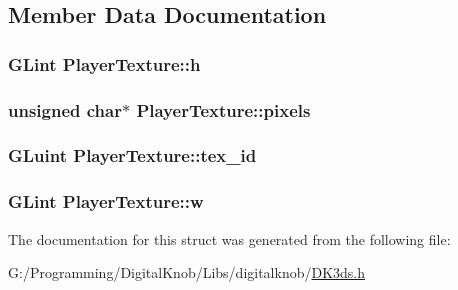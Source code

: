 \subsection{Member Data Documentation}
\hypertarget{struct_player_texture_a2b5358c10f1b91f060de579182ec6cd7}{
\subsubsection[{h}]{\setlength{\rightskip}{0pt plus 5cm}G\-Lint Player\-Texture\-::h}}\label{struct_player_texture_a2b5358c10f1b91f060de579182ec6cd7}
\hypertarget{struct_player_texture_ad61cf88f950df3a4307de8faaef27ef1}{
\subsubsection[{pixels}]{\setlength{\rightskip}{0pt plus 5cm}unsigned char$\ast$ Player\-Texture\-::pixels}}\label{struct_player_texture_ad61cf88f950df3a4307de8faaef27ef1}
\hypertarget{struct_player_texture_a575b2f0ae5e77986b6a66aab3805c3ab}{
\subsubsection[{tex\-\_\-id}]{\setlength{\rightskip}{0pt plus 5cm}G\-Luint Player\-Texture\-::tex\-\_\-id}}\label{struct_player_texture_a575b2f0ae5e77986b6a66aab3805c3ab}
\hypertarget{struct_player_texture_acf6bc46b16bb53bf8599b41282d65117}{
\subsubsection[{w}]{\setlength{\rightskip}{0pt plus 5cm}G\-Lint Player\-Texture\-::w}}\label{struct_player_texture_acf6bc46b16bb53bf8599b41282d65117}


The documentation for this struct was generated from the following file\-:\begin{DoxyCompactItemize}
\item 
G\-:/\-Programming/\-Digital\-Knob/\-Libs/digitalknob/\hyperlink{_d_k3ds_8h}{D\-K3ds.\-h}\end{DoxyCompactItemize}
